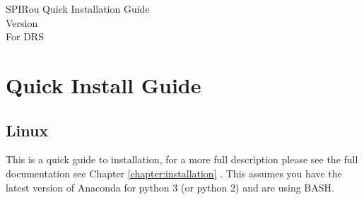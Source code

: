 \ifquickguide
\begin{center}
{{\Huge SPIRou Quick Installation Guide} \\ {\small Version \MyVersionDev \\ For DRS \instrument \MyCodeVersion}}
\end{center}
\else
\chapter{Quick Install Guide}
\label{chapter:quickinstallation}
\fi

\section{Linux}

\noindent This is a quick guide to installation, for a more full description please \ifquickguide see the full documentation \else see Chapter \ref{chapter:installation} \fi. This assumes you have the latest version of Anaconda for python 3 (or python 2) and are using BASH.


